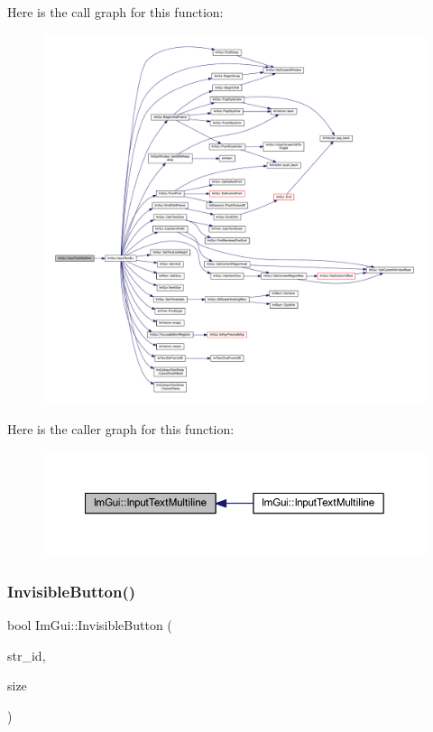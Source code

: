 Here is the call graph for this function\+:
\nopagebreak
\begin{figure}[H]
\begin{center}
\leavevmode
\includegraphics[width=350pt]{namespace_im_gui_a0470693929ed9930cbf5b737577c2414_cgraph}
\end{center}
\end{figure}
Here is the caller graph for this function\+:
\nopagebreak
\begin{figure}[H]
\begin{center}
\leavevmode
\includegraphics[width=350pt]{namespace_im_gui_a0470693929ed9930cbf5b737577c2414_icgraph}
\end{center}
\end{figure}
\mbox{\label{namespace_im_gui_a22668d440cbbb1f8be07241d9c6d9096}} 
\subsubsection{\texorpdfstring{Invisible\+Button()}{InvisibleButton()}}
{\footnotesize\ttfamily bool Im\+Gui\+::\+Invisible\+Button (\begin{DoxyParamCaption}\item[{const char $\ast$}]{str\+\_\+id,  }\item[{const \mbox{\hyperlink{struct_im_vec2}{Im\+Vec2}} \&}]{size }\end{DoxyParamCaption})}


